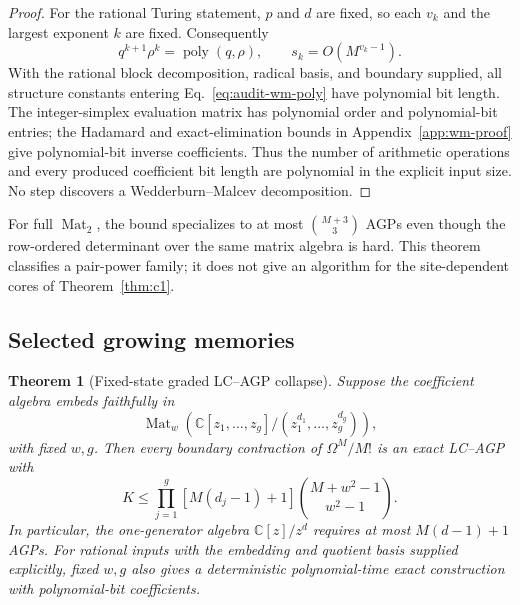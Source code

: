 \documentclass[aps,pra,reprint,superscriptaddress,nofootinbib,longbibliography,showkeys]{revtex4-2}
\newtheorem{theorem}{Theorem}[section]
\theoremstyle{definition}
\newcommand{\Mat}{\operatorname{Mat}}
\begin{document}
\begin{proof}
For the rational Turing statement, $p$ and $d$ are fixed, so each $v_k$ and
the largest exponent $k$ are fixed.  Consequently
\begin{equation}
q^{k+1}\rho^k=\operatorname{poly}(q,\rho),\qquad
s_k=O(M^{v_k-1}).
\end{equation}
With the rational block decomposition, radical basis, and boundary supplied,
all structure constants entering Eq.~\eqref{eq:audit-wm-poly} have
polynomial bit length.  The integer-simplex evaluation matrix has polynomial
order and polynomial-bit entries; the Hadamard and exact-elimination bounds in
Appendix~\ref{app:wm-proof} give polynomial-bit inverse coefficients.  Thus
the number of arithmetic operations and every produced coefficient bit length
are polynomial in the explicit input size.  No step discovers a
Wedderburn--Malcev decomposition.
\end{proof}

For full $\Mat_2$, the bound specializes to at most $\binom{M+3}{3}$ AGPs even
though the row-ordered determinant over the same matrix algebra is hard.  This
theorem classifies a pair-power family; it does not give an algorithm for the
site-dependent cores of Theorem~\ref{thm:c1}.

\subsection{Selected growing memories}

\begin{theorem}[Fixed-state graded LC--AGP collapse]
Suppose the coefficient algebra embeds faithfully in
\[
 \Mat_w\!\left(\mathbb C[z_1,\ldots,z_g]/
 (z_1^{d_1},\ldots,z_g^{d_g})\right),
\]
with fixed $w,g$.  Then every boundary contraction of $\Omega^M/M!$ is an
exact LC--AGP with
\[
 K\le\prod_{j=1}^g[M(d_j-1)+1]
 \binom{M+w^2-1}{w^2-1}.
 \label{eq:graded-collapse}
\]
In particular, the one-generator algebra $\mathbb C[z]/z^d$ requires at most
$M(d-1)+1$ AGPs.  For rational inputs with the embedding and quotient basis
supplied explicitly, fixed $w,g$ also gives a deterministic polynomial-time
exact construction with polynomial-bit coefficients.
\end{theorem}
\end{document}
